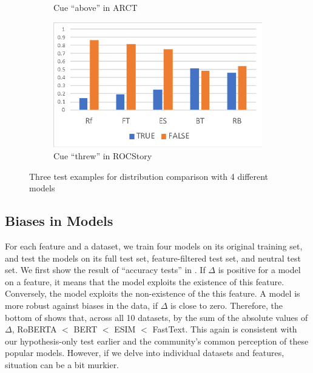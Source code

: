 \begin{figure}[th]
\begin{subfigure}[b]{0.3\textwidth}
\caption{Cue ``above'' in ARCT}
\label{fig:cue_above}
\end{subfigure}
\hfill
\begin{subfigure}[b]{0.3\textwidth}
\centering
\includegraphics[width=\columnwidth]{picture/threw_roc.eps}
\caption{Cue ``threw'' in ROCStory}
\label{fig:cue_threw}
\end{subfigure}
\caption{Three test examples for distribution comparison with 4 different models}
\label{fig:cue_result}
\end{figure}

\subsection{Biases in Models}

For each feature and a dataset, 
we train four models on its original training set,
and test the models on its full test set, feature-filtered test set, and neutral test set.   
We first show the result of ``accuracy tests'' in .
If $\Delta$ is positive for a model on a feature, it means that
the model exploits the existence of this feature. Conversely,
the model exploits the non-existence of the this feature.
A model is more robust against biases in the data, if $\Delta$ is
close to zero.
Therefore, the bottom of  shows that,
across all 10 datasets, by the sum of the absolute values of $\Delta$, 
RoBERTA $<$ BERT $<$ ESIM $<$ FastText. This again is consistent with
our hypothesis-only test earlier and 
the community's common perception of these popular models.
However, if we delve into individual datasets and features, 
situation can be a bit murkier.


